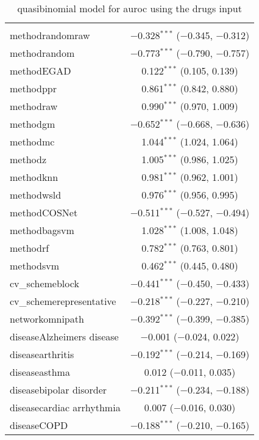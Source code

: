 
\begin{table}[!htbp] \centering 
  \caption{quasibinomial model for auroc using the drugs input} 
  \label{} 
\begin{tabular}{@{\extracolsep{5pt}}lc} 
\\[-1.8ex]\hline 
\hline \\[-1.8ex] 
 methodrandomraw & $-$0.328$^{***}$ ($-$0.345, $-$0.312) \\ 
  methodrandom & $-$0.773$^{***}$ ($-$0.790, $-$0.757) \\ 
  methodEGAD & 0.122$^{***}$ (0.105, 0.139) \\ 
  methodppr & 0.861$^{***}$ (0.842, 0.880) \\ 
  methodraw & 0.990$^{***}$ (0.970, 1.009) \\ 
  methodgm & $-$0.652$^{***}$ ($-$0.668, $-$0.636) \\ 
  methodmc & 1.044$^{***}$ (1.024, 1.064) \\ 
  methodz & 1.005$^{***}$ (0.986, 1.025) \\ 
  methodknn & 0.981$^{***}$ (0.962, 1.001) \\ 
  methodwsld & 0.976$^{***}$ (0.956, 0.995) \\ 
  methodCOSNet & $-$0.511$^{***}$ ($-$0.527, $-$0.494) \\ 
  methodbagsvm & 1.028$^{***}$ (1.008, 1.048) \\ 
  methodrf & 0.782$^{***}$ (0.763, 0.801) \\ 
  methodsvm & 0.462$^{***}$ (0.445, 0.480) \\ 
  cv\_schemeblock & $-$0.441$^{***}$ ($-$0.450, $-$0.433) \\ 
  cv\_schemerepresentative & $-$0.218$^{***}$ ($-$0.227, $-$0.210) \\ 
  networkomnipath & $-$0.392$^{***}$ ($-$0.399, $-$0.385) \\ 
  diseaseAlzheimers disease & $-$0.001 ($-$0.024, 0.022) \\ 
  diseasearthritis & $-$0.192$^{***}$ ($-$0.214, $-$0.169) \\ 
  diseaseasthma & 0.012 ($-$0.011, 0.035) \\ 
  diseasebipolar disorder & $-$0.211$^{***}$ ($-$0.234, $-$0.188) \\ 
  diseasecardiac arrhythmia & 0.007 ($-$0.016, 0.030) \\ 
  diseaseCOPD & $-$0.188$^{***}$ ($-$0.210, $-$0.165) \\ 

\end{tabular}
\end{table}
